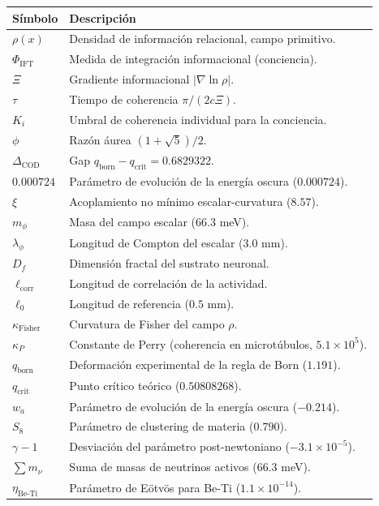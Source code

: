 \documentclass[12pt, a4paper]{article}
\theoremstyle{miuThm}
\theoremstyle{remark}
\newcommand{\eps}{0.000724}
\begin{document}
\begin{longtable}{lp{10cm}}
\toprule
\textbf{Símbolo} & \textbf{Descripción} \\
\midrule
$\rho(x)$ & Densidad de información relacional, campo primitivo. \\
$\Phi_{\text{IFT}}$ & Medida de integración informacional (conciencia). \\
$\Xi$ & Gradiente informacional $|\nabla\ln\rho|$. \\
$\tau$ & Tiempo de coherencia $\pi/(2c\Xi)$. \\
$K_i$ & Umbral de coherencia individual para la conciencia. \\
$\phi$ & Razón áurea $(1+\sqrt5)/2$. \\
$\Delta_{\text{COD}}$ & Gap $q_{\text{born}} - q_{\text{crit}} = 0.6829322$. \\
$\eps$ & Parámetro de evolución de la energía oscura ($0.000724$). \\
$\xi$ & Acoplamiento no mínimo escalar-curvatura ($8.57$). \\
$m_\phi$ & Masa del campo escalar ($66.3$ meV). \\
$\lambda_\phi$ & Longitud de Compton del escalar ($3.0$ mm). \\
$D_f$ & Dimensión fractal del sustrato neuronal. \\
$\ell_{\text{corr}}$ & Longitud de correlación de la actividad. \\
$\ell_0$ & Longitud de referencia ($0.5$ mm). \\
$\kappa_{\text{Fisher}}$ & Curvatura de Fisher del campo $\rho$. \\
$\kappa_P$ & Constante de Perry (coherencia en microtúbulos, $5.1\times10^5$). \\
$q_{\text{born}}$ & Deformación experimental de la regla de Born ($1.191$). \\
$q_{\text{crit}}$ & Punto crítico teórico ($0.50808268$). \\
$w_a$ & Parámetro de evolución de la energía oscura ($-0.214$). \\
$S_8$ & Parámetro de clustering de materia ($0.790$). \\
$\gamma-1$ & Desviación del parámetro post-newtoniano ($-3.1\times10^{-5}$). \\
$\sum m_\nu$ & Suma de masas de neutrinos activos ($66.3$ meV). \\
$\eta_{\text{Be-Ti}}$ & Parámetro de Eötvös para Be-Ti ($1.1\times10^{-14}$). \\
\bottomrule
\end{longtable}
\end{document}
